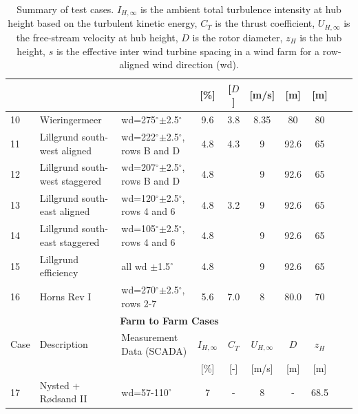 \documentclass[a4paper,oneside]{article}
\newcommand{\degree}{\ensuremath{^\circ}}
\begin{document}
\begin{table}[h!]
{\begin{tabular}{lllccccccc}
      &	           &		      &	 [\%]	      &  [$D$]      & [m/s] 		& [m]  & [m] \\ \hline
10 & Wieringermeer & wd=275\degree$\pm$2.5\degree & 9.6 & 3.8 & 8.35 & 80 & 80 \\
11 & Lillgrund south-west aligned & wd=222\degree$\pm$2.5\degree, rows B and D & 4.8 & 4.3 & 9 & 92.6 & 65 \\
12 & Lillgrund south-west staggered & wd=207\degree$\pm$2.5\degree, rows B and D & 4.8 &  & 9 & 92.6 & 65 \\
13 & Lillgrund south-east aligned & wd=120\degree$\pm$2.5\degree, rows 4 and 6 & 4.8 & 3.2 & 9 & 92.6 & 65 \\
14 & Lillgrund south-east staggered & wd=105\degree$\pm$2.5\degree, rows 4 and 6 & 4.8 &  & 9 & 92.6 & 65 \\
15 & Lillgrund efficiency & all wd $\pm$1.5\degree & 4.8 &  & 9 & 92.6 & 65 \\
16 & Horns Rev I & wd=270\degree$\pm$2.5\degree, rows 2-7 & 5.6 & 7.0 & 8 & 80.0 & 70 \\ \hline
\multicolumn{8}{c}{\textbf{Farm to Farm Cases}} \\ \hline
Case & Description & Measurement Data (SCADA) & $I_{H,\infty}$ & $C_T$  &   $U_{H,\infty}$     & $D$  & $z_H$ \\      &	           &		      &	 [\%]	        & [-]      & [m/s] 		& [m]  & [m] \\ \hline
17 & Nysted + Rødsand II & wd=57-110\degree & 7 & - & 8 & - & 68.5 
\end{tabular}%
}
\caption{Summary of test cases. $I_{H,\infty}$ is the ambient total turbulence intensity at hub height based on the turbulent kinetic energy, $C_T$ is the thrust coefficient, $U_{H,\infty}$ is the free-stream velocity at hub height, $D$ is the rotor diameter, $z_H$ is the hub height, $s$ is the effective inter wind turbine spacing in a wind farm for a row-aligned wind direction (wd).}\label{tab:cases}
\end{table}
\end{document}
